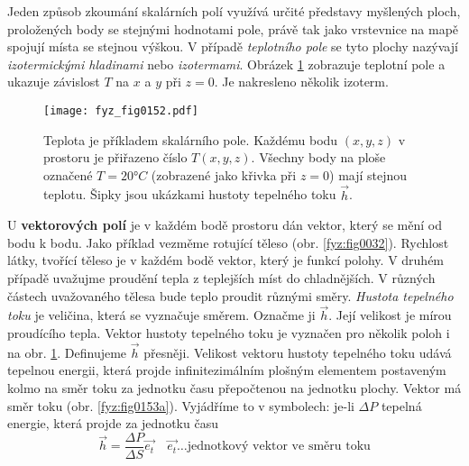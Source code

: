       Jeden způsob zkoumání skalár\-ních polí využívá určité představy myšle\-ných ploch, 
      pro\-ložených body se stejnými hodnotami pole, právě tak jako vrstevnice na mapě spojují 
      místa se stejnou výškou. V případě \emph{teplotního pole} se tyto plochy nazývají 
      \emph{izotermickými hladinami} nebo \emph{izotermami}. Obrázek \ref{fyz:fig0152} zobrazuje 
      teplotní pole a ukazuje závislost \(T\) na \(x\) a \(y\) při \(z = 0\). Je nakresleno několik 
      izoterm.
  
      \begin{figure}[ht!]
        \centering
        \texttt{[image: fyz\_fig0152.pdf]}
        \caption{Teplota je příkladem skalárního pole. Každému bodu $(x,y,z)$ v prostoru je 
                přiřazeno číslo $T(x,y,z)$. Všechny body na ploše označené $T = 20°C$ (zobrazené 
                jako křivka při $z=0$) mají stejnou teplotu. Šipky jsou ukázkami hustoty tepelného 
                toku $\vec{h}$.
                \cite[s.~29]{Feynman02}}
        \label{fyz:fig0152} 
      \end{figure}
            
      U \textbf{vektorových polí} je v každém bodě prostoru dán vektor, který se mění od bodu k
      bodu. Jako příklad vezměme rotující těleso (obr. \ref{fyz:fig0032}). Rychlost látky, tvořící
      těleso je v každém bodě vektor, který je funkcí polohy. V druhém případě uvažujme proudění
      tepla z teplejších míst do chladnějších. V různých částech uvažovaného tělesa bude teplo
      proudit různými směry. \emph{Hustota tepelného toku} je veličina, která se vyznačuje směrem.
      Označme ji $\vec{h}$. Její velikost je mírou proudícího tepla. Vektor hustoty tepelného toku
      je vyznačen pro několik poloh i na obr. \ref{fyz:fig0152}. Definujeme $\vec{h}$ přesněji.
      Velikost vektoru hustoty tepelného toku udává tepelnou energii, která projde infinitezimálním
      plošným elementem postaveným kolmo na směr toku za jednotku času přepočtenou na  jednotku
      plochy. Vektor má směr toku (obr. \ref{fyz:fig0153a}). Vyjádříme to v symbolech: je-li $\Delta
      P$ tepelná energie, která projde za jednotku času
      \begin{equation*}     %
        \vec{h}=\frac{\Delta P}{\Delta S}\vec{e_t}
                \quad \vec{e_t}\ldots\text{jednotkový vektor ve směru toku}
      \end{equation*}   
  
            

